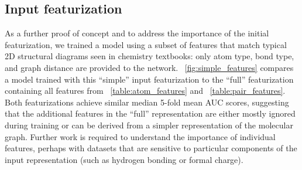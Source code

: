 
\subsection{Input featurization}
\label{sec:simple_features}

As a further proof of concept and to address the importance of the initial
featurization, we trained a model using a subset of features that match typical
2D structural diagrams seen in chemistry textbooks: only atom type, bond type,
and graph distance are provided to the network.
\figurename~\ref{fig:simple_features} compares a model trained with this
``simple'' input featurization to the ``full'' featurization containing all
features from \tablename~\ref{table:atom_features} and
\tablename~\ref{table:pair_features}. Both featurizations achieve similar median
5-fold mean AUC scores, suggesting that the additional features
in the ``full'' representation are either mostly ignored during training or can
be derived from a simpler representation of the molecular graph. Further work is
required to understand the importance of individual features, perhaps with
datasets that are sensitive to particular components of the input representation
(such as hydrogen bonding or formal charge).

